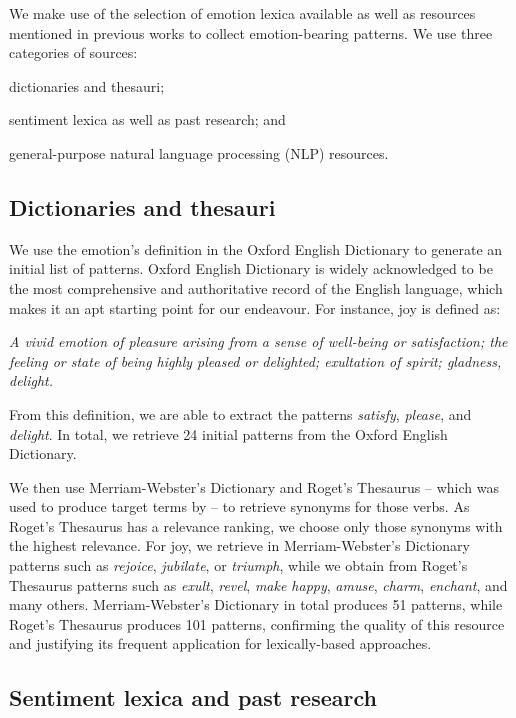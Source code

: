 We make use of the selection of emotion lexica available as well as resources mentioned in previous works to collect emotion-bearing patterns. We use three categories of sources: \begin{inparaenum} \item dictionaries and thesauri; \item sentiment lexica as well as past research; and \item general-purpose natural language processing (NLP) resources.
\end{inparaenum}  

\subsection{Dictionaries and thesauri}

We use the emotion's definition in the Oxford English Dictionary to generate an initial list of patterns. Oxford English Dictionary is widely acknowledged to be the most comprehensive and authoritative record of the English language, which makes it an apt starting point for our endeavour. For instance, joy is defined as:

\textit{A vivid emotion of pleasure arising from a sense of well-being or
satisfaction; the feeling or state of being highly pleased or delighted;
exultation of spirit; gladness, delight.}

From this definition, we are able to extract the patterns \textit{satisfy}, \textit{please}, and \textit{delight}. In total, we retrieve 24 initial patterns from the Oxford English Dictionary.

We then use Merriam-Webster's Dictionary and Roget's Thesaurus -- which was used to produce target terms by \citeauthor{nrc_emolex} -- to retrieve synonyms for those verbs. As Roget's Thesaurus has a relevance ranking, we choose only those synonyms with the highest relevance. For joy, we retrieve in Merriam-Webster's Dictionary patterns such as \textit{rejoice}, \textit{jubilate}, or \textit{triumph}, while we obtain from Roget's Thesaurus patterns such as \textit{exult}, \textit{revel}, \textit{make happy}, \textit{amuse}, \textit{charm}, \textit{enchant}, and many others. Merriam-Webster's Dictionary in total produces 51 patterns, while Roget's Thesaurus produces 101 patterns, confirming the quality of this resource and justifying its frequent application for lexically-based approaches.

\subsection{Sentiment lexica and past research}

